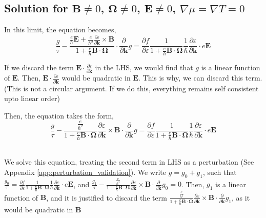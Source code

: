 \documentclass[aps,pra,amsmath,amssymb,floatfix,twocolumn, amsmath, superscriptaddress, twocolumn]{revtex4-2}
\newcommand{\bvec}[1]{{\mathbf #1}}
\begin{document}
\subsection{Solution for $\bvec{B}\neq0$, $\bvec{\Omega}\neq 0$, $\bvec{E} \neq 0$, $\nabla \mu = \nabla T = 0$}

In this limit, the equation becomes,
$$
\frac{g}{\tau} -\frac{\frac{e}{\hbar} \bvec{E} +\frac{e}{\hbar^2} \frac{\partial \varepsilon}{\partial \bvec{k}} \times \bvec{B}}{1 + \frac{e}{\hbar} \bvec{B}\cdot\bvec{\Omega}} \cdot\frac{\partial}{\partial \bvec{k}} g = \frac{\partial f}{\partial \varepsilon}\frac{1}{1 + \frac{e}{\hbar} \bvec{B}\cdot\bvec{\Omega}}
\frac{1}{\hbar} \frac{\partial \varepsilon}{\partial \bvec{k}}\cdot e \bvec{E} $$

If we discard the term $\bvec{E} \cdot \frac{\partial \varepsilon}{\partial \bvec{k}}$ in the LHS, we would find that $g$ is a linear function of $\bvec{E}$. Then, $\bvec{E} \cdot \frac{\partial \varepsilon}{\partial \bvec{k}}$ would be quadratic in $\bvec{E}$. This is why, we can discard this term. (This is not a circular argument. If we do this, everything remains self consistent upto linear order)

Then, the equation takes the form,
\begin{equation}
\frac{g}{\tau} -\frac{\frac{e}{\hbar^2} }{1 + \frac{e}{\hbar} \bvec{B}\cdot\bvec{\Omega}} \frac{\partial \varepsilon}{\partial \bvec{k}} \times \bvec{B} \cdot\frac{\partial}{\partial \bvec{k}} g = \frac{\partial f}{\partial \varepsilon}\frac{1}{1 + \frac{e}{\hbar} \bvec{B}\cdot\bvec{\Omega}}
\frac{1}{\hbar} \frac{\partial \varepsilon}{\partial \bvec{k}}\cdot e \bvec{E}
\end{equation}~\label{Eq:BTE_zero_chem_pot_thermal_gradient}

We solve this equation, treating the second term in LHS as a perturbation (See Appendix \ref{app:perturbation_validation}).
We write $g = g_0 + g_1$, such that $\frac{g_0}{\tau} = \frac{\partial f}{\partial \varepsilon}\frac{1}{1 + \frac{e}{\hbar} \bvec{B}\cdot\bvec{\Omega}}
\frac{1}{\hbar} \frac{\partial \varepsilon}{\partial \bvec{k}}\cdot e \bvec{E}$, and $\frac{g_1}{\tau} -\frac{\frac{e}{\hbar^2} }{1 + \frac{e}{\hbar} \bvec{B}\cdot\bvec{\Omega}} \frac{\partial \varepsilon}{\partial \bvec{k}} \times \bvec{B} \cdot\frac{\partial}{\partial \bvec{k}} g_0 = 0$.
Then, $g_1$ is a linear function of $\bvec{B}$, and it is justified to discard the term $\frac{\frac{e}{\hbar^2} }{1 + \frac{e}{\hbar} \bvec{B}\cdot\bvec{\Omega}} \frac{\partial \varepsilon}{\partial \bvec{k}} \times \bvec{B} \cdot\frac{\partial}{\partial \bvec{k}} g_1$, as it would be quadratic in $\bvec{B}$
\end{document}
